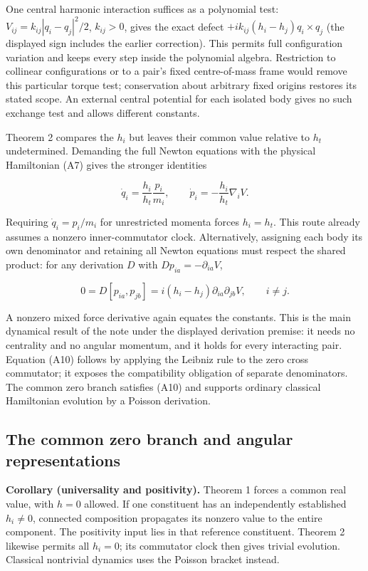 \documentclass[11pt,a4paper]{article}
\begin{document}
One central harmonic interaction suffices as a polynomial test:
\(V_{ij}=k_{ij}|q_i-q_j|^2/2\), \(k_{ij}>0\), gives the exact defect
\(+ik_{ij}(h_i-h_j)q_i\times q_j\) (the displayed sign includes the
earlier correction). This permits full configuration variation and keeps
every step inside the polynomial algebra. Restriction to collinear
configurations or to a pair's fixed centre-of-mass frame would remove
this particular torque test; conservation about arbitrary fixed origins
restores its stated scope. An external central potential for each
isolated body gives no such exchange test and allows different
constants.

Theorem 2 compares the \(h_i\) but leaves their common value relative to
\(h_t\) undetermined. Demanding the full Newton equations with the
physical Hamiltonian (A7) gives the stronger identities

\[
\dot q_i=\frac{h_i}{h_t}\frac{p_i}{m_i},\qquad
\dot p_i=-\frac{h_i}{h_t}\nabla_i V. \tag{A9}
\]

Requiring \(\dot q_i=p_i/m_i\) for unrestricted momenta forces
\(h_i=h_t\). This route already assumes a nonzero inner-commutator
clock. Alternatively, assigning each body its own denominator and
retaining all Newton equations must respect the shared product: for any
derivation \(D\) with \(Dp_{ia}=-\partial_{ia}V\),

\[
0=D[p_{ia},p_{jb}]
=i(h_i-h_j)\partial_{ia}\partial_{jb}V,\qquad i\ne j. \tag{A10}
\]

A nonzero mixed force derivative again equates the constants. This is
the main dynamical result of the note under the displayed derivation
premise: it needs no centrality and no angular momentum, and it holds
for every interacting pair. Equation (A10) follows by applying the
Leibniz rule to the zero cross commutator; it exposes the compatibility
obligation of separate denominators. The common zero branch satisfies
(A10) and supports ordinary classical Hamiltonian evolution by a Poisson
derivation.

\hypertarget{the-common-zero-branch-and-angular-representations}{%
\subsection{The common zero branch and angular
representations}\label{the-common-zero-branch-and-angular-representations}}

\textbf{Corollary (universality and positivity).} Theorem 1 forces a
common real value, with \(h=0\) allowed. If one constituent has an
independently established \(h_i\ne0\), connected composition propagates
its nonzero value to the entire component. The positivity input lies in
that reference constituent. Theorem 2 likewise permits all \(h_i=0\);
its commutator clock then gives trivial evolution. Classical nontrivial
dynamics uses the Poisson bracket instead.
\end{document}
